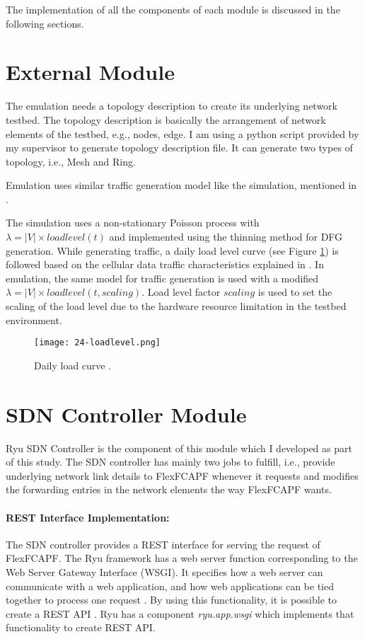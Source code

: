 The implementation of all the components of each module is discussed in the following sections.

\section{External Module}\label{sec:el}
The emulation needs a topology description to create its underlying network testbed. The topology description is basically the arrangement of network elements of the testbed, e.g., nodes, edge. I am using a python script provided by my supervisor to generate topology description file. It can generate two types of topology, i.e., Mesh and Ring.

Emulation uses similar traffic generation model like the simulation, mentioned in \cite{7343600}. 

The simulation uses a non-stationary Poisson process with $\lambda = |V| \times loadlevel(t)$ and implemented using the thinning method \cite{Law:1999:SMA:554952} for DFG generation. While generating traffic, a daily load level curve (see Figure \ref{fig:24loadlevel}) is followed based on the cellular data traffic characteristics explained in \cite{Zhang:2012:UCC:2342468.2342472}. In emulation, the same model for traffic generation is used with a modified $\lambda = |V| \times loadlevel(t, scaling)$. Load level factor $scaling$ is used to set the scaling of the load level due to the hardware resource limitation in the testbed environment.

\begin{figure}[H]
	\begin{center}
		{\texttt{[image: 24-loadlevel.png]}}
		\caption{Daily load curve \cite{7343600}.}
		\label{fig:24loadlevel}
	\end{center}
\end{figure}

\section{SDN Controller Module}\label{sec:fca}
Ryu SDN Controller is the component of this module which I developed as part of this study. The SDN controller has mainly two jobs to fulfill, i.e., provide underlying network link details to FlexFCAPF whenever it requests and modifies the forwarding entries in the network elements the way FlexFCAPF wants.

\paragraph{REST Interface Implementation:}
The SDN controller provides a REST interface for serving the request of FlexFCAPF. The Ryu framework has a web server function corresponding to the Web Server Gateway Interface (WSGI). It specifies how a web server can communicate with a web application, and how web applications can be tied together to process one request \cite{wsgi}. By using this functionality, it is possible to create a REST API \cite{ryu}. Ryu has a component \textit{ryu.app.wsgi} which implements that functionality to create REST API.


